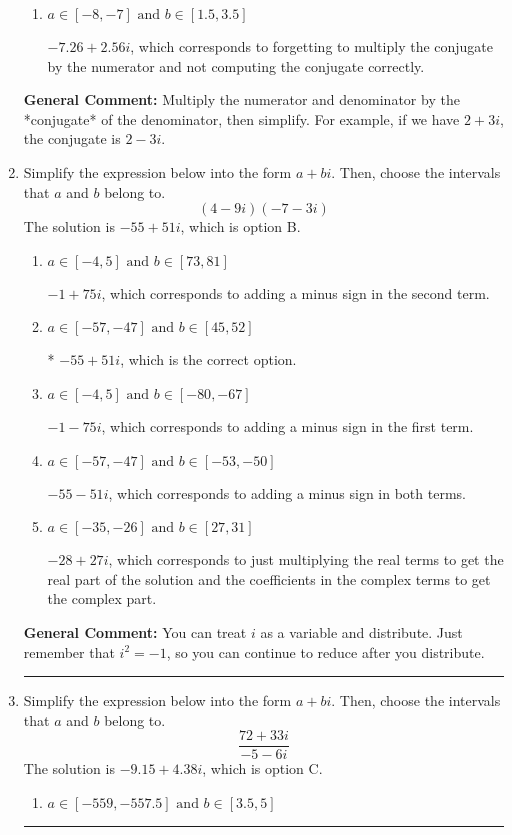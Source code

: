 \documentclass{extbook}[14pt]
\newcommand{\litem}[1]{\item #1

\rule{\textwidth}{0.4pt}}
\begin{document}
\begin{enumerate}
{\begin{enumerate}[label=\Alph*.]
 $5.68  + 177.00 i$, which corresponds to forgetting to multiply the conjugate by the numerator.
\item \( a \in [-8, -7] \text{ and } b \in [1.5, 3.5] \)

 $-7.26  + 2.56 i$, which corresponds to forgetting to multiply the conjugate by the numerator and not computing the conjugate correctly.
\end{enumerate}

\textbf{General Comment:} Multiply the numerator and denominator by the *conjugate* of the denominator, then simplify. For example, if we have $2+3i$, the conjugate is $2-3i$.
}
\litem{
Simplify the expression below into the form $a+bi$. Then, choose the intervals that $a$ and $b$ belong to.
\[ (4 - 9 i)(-7 - 3 i) \]The solution is \( -55 + 51 i \), which is option B.\begin{enumerate}[label=\Alph*.]
\item \( a \in [-4, 5] \text{ and } b \in [73, 81] \)

 $-1 + 75 i$, which corresponds to adding a minus sign in the second term.
\item \( a \in [-57, -47] \text{ and } b \in [45, 52] \)

* $-55 + 51 i$, which is the correct option.
\item \( a \in [-4, 5] \text{ and } b \in [-80, -67] \)

 $-1 - 75 i$, which corresponds to adding a minus sign in the first term.
\item \( a \in [-57, -47] \text{ and } b \in [-53, -50] \)

 $-55 - 51 i$, which corresponds to adding a minus sign in both terms.
\item \( a \in [-35, -26] \text{ and } b \in [27, 31] \)

 $-28 + 27 i$, which corresponds to just multiplying the real terms to get the real part of the solution and the coefficients in the complex terms to get the complex part.
\end{enumerate}

\textbf{General Comment:} You can treat $i$ as a variable and distribute. Just remember that $i^2=-1$, so you can continue to reduce after you distribute.
}
\litem{
Simplify the expression below into the form $a+bi$. Then, choose the intervals that $a$ and $b$ belong to.
\[ \frac{72 + 33 i}{-5 - 6 i} \]The solution is \( -9.15  + 4.38 i \), which is option C.\begin{enumerate}[label=\Alph*.]
\item \( a \in [-559, -557.5] \text{ and } b \in [3.5, 5] \)


\end{enumerate}}
\end{enumerate}
\end{document}
